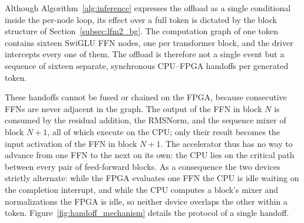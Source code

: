Although Algorithm~\ref{alg:inference} expresses the offload as a single conditional
inside the per-node loop, its effect over a full token is dictated by the block
structure of Section~\ref{subsec:lfm2_bg}. The computation graph of one token contains
sixteen SwiGLU FFN nodes, one per transformer block, and the driver intercepts every
one of them. The offload is therefore not a single event but a sequence of sixteen
separate, synchronous CPU--FPGA handoffs per generated token.

These handoffs cannot be fused or chained on the FPGA, because consecutive FFNs are
never adjacent in the graph. The output of the FFN in block $N$ is consumed by the
residual addition, the RMSNorm, and the sequence mixer of block $N{+}1$, all of which
execute on the CPU; only their result becomes the input activation of the FFN in block
$N{+}1$. The accelerator thus has no way to advance from one FFN to the next on its own:
the CPU lies on the critical path between every pair of feed-forward blocks. As a
consequence the two devices strictly alternate: while the FPGA evaluates one FFN the CPU
is idle waiting on the completion interrupt, and while the CPU computes a block's mixer
and normalizations the FPGA is idle, so neither device overlaps the other within a token.
Figure~\ref{fig:handoff_mechanism} details the protocol of a single handoff.

